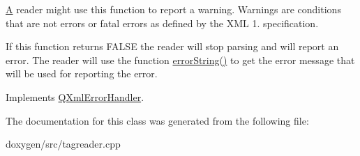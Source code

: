 \mbox{\hyperlink{class_a}{A}} reader might use this function to report a warning. Warnings are conditions that are not errors or fatal errors as defined by the X\+ML 1. specification.

If this function returns F\+A\+L\+SE the reader will stop parsing and will report an error. The reader will use the function \mbox{\hyperlink{class_tag_file_error_handler_a699ed3bca495674a04d051a6a7a0b96d}{error\+String()}} to get the error message that will be used for reporting the error. 

Implements \mbox{\hyperlink{class_q_xml_error_handler_a79ae0cce3316a76b7777c6e90b101afe}{Q\+Xml\+Error\+Handler}}.



The documentation for this class was generated from the following file\+:\begin{DoxyCompactItemize}
\item 
doxygen/src/tagreader.\+cpp\end{DoxyCompactItemize}

